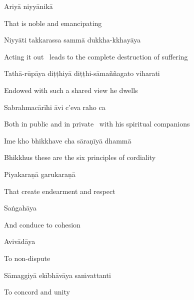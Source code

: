 Ariyā niyyānikā

\ifbfive\enlargethispage{1\baselineskip}\fi

\begin{english}
  That is noble and emancipating
\end{english}


Niyyāti takkarassa sammā dukkha-kkhayāya

\begin{english-hang}
  Acting it out \breathmark\ leads to the complete destruction of suffering
\end{english-hang}

\ifninebythirteen\clearpage\fi

Tathā-rūpāya diṭṭhiyā diṭṭhi-sāmaññagato viharati

\begin{english}
  Endowed with such a shared view he dwells
\end{english}

Sabrahmacārīhi āvi c'eva raho ca

\begin{english-hang}
  Both in public and in private \breathmark\ with his spiritual companions
\end{english-hang}

Ime kho bhikkhave cha sāraṇīyā dhammā

\begin{english}
  Bhikkhus these are the six principles of cordiality
\end{english}

Piyakaraṇā garukaraṇā

\begin{english}
  That create endearment and respect
\end{english}

Saṅgahāya

\begin{english}
  And conduce to cohesion
\end{english}

Avivādāya

\begin{english}
  To non-dispute
\end{english}

Sāmaggiyā ekībhāvāya saṁvattanti

\begin{english}
  To concord and unity
\end{english}

\suttaRef{[MN 48]}

